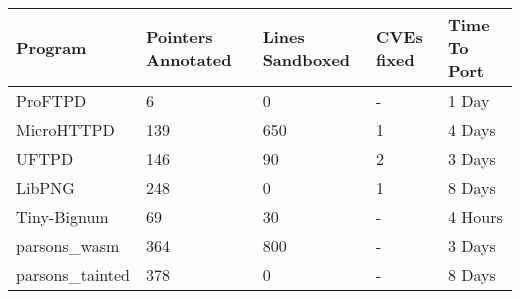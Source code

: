 \begin{center}
\begin{tabular}{||p{2 cm} | p{1.2cm} | p{1.2cm} | p{1.0cm} | p{1.0cm}||} 
 \hline
 Program & Pointers Annotated  & Lines Sandboxed & CVEs fixed & Time To Port \\ [0.5ex] 
 \hline\hline
 ProFTPD & 6 & 0 & - & 1 Day  \\
 \hline
 MicroHTTPD & 139 & 650 & 1 & 4 Days \\
 \hline
 UFTPD & 146 & 90 & 2 & 3 Days \\ 
 \hline
 LibPNG & 248 &  0 & 1 & 8 Days \\
 \hline
 Tiny-Bignum &  69 &  30 & - & 4 Hours \\
 \hline
 parsons\_wasm & 364 & 800 &  - & 3 Days \\ 
 \hline
 parsons\_tainted & 378 & 0 & - & 8 Days \\ [1ex]
 \hline 
\end{tabular}
\end{center}
% 







